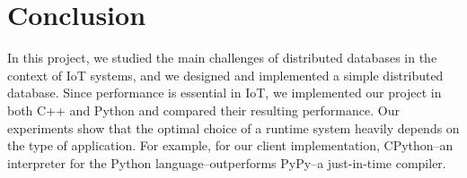 
\section{Conclusion}
\label{sec:Conclusion}
In this project, we studied the main challenges of distributed databases in the context of IoT systems, and we designed and implemented a simple distributed database. Since performance is essential in IoT, we implemented our project in both C++ and Python and compared their resulting performance. Our experiments show that the optimal choice of a runtime system heavily depends on the type of application. For example, for our client implementation, CPython--an interpreter for the Python language--outperforms PyPy--a just-in-time compiler.

